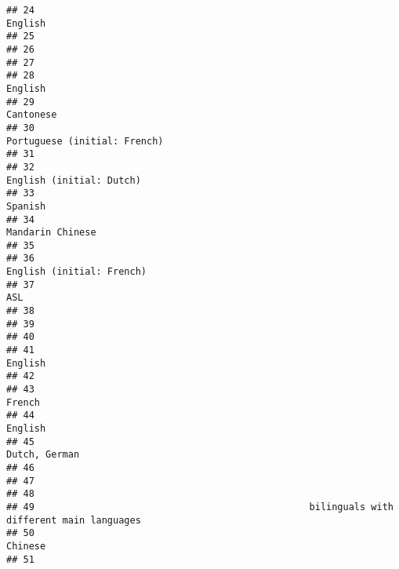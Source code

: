 \documentclass[
  english,
  man]{apa6}
\begin{document}
\begin{verbatim}
## 24                                                                                  English
## 25                                                                                         
## 26                                                                                         
## 27                                                                                         
## 28                                                                                  English
## 29                                                                                Cantonese
## 30                                                             Portuguese (initial: French)
## 31                                                                                         
## 32                                                                 English (initial: Dutch)
## 33                                                                                  Spanish
## 34                                                                         Mandarin Chinese
## 35                                                                                         
## 36                                                                English (initial: French)
## 37                                                                                      ASL
## 38                                                                                         
## 39                                                                                         
## 40                                                                                         
## 41                                                                                  English
## 42                                                                                         
## 43                                                                                   French
## 44                                                                                  English
## 45                                                                            Dutch, German
## 46                                                                                         
## 47                                                                                         
## 48                                                                                         
## 49                                                 bilinguals with different main languages
## 50                                                                                  Chinese
## 51                                                                                         

\end{verbatim}
\end{document}
